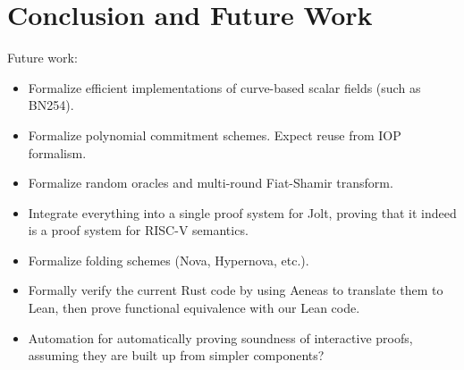 \section{Conclusion and Future Work}

Future work:
\begin{itemize}
    \item Formalize efficient implementations of curve-based scalar fields (such as BN254).
    \item Formalize polynomial commitment schemes. Expect reuse from IOP formalism.
    \item Formalize random oracles and multi-round Fiat-Shamir transform.
    \item Integrate everything into a single proof system for Jolt, proving that it indeed is a proof system for RISC-V semantics.
    \item Formalize folding schemes (Nova, Hypernova, etc.).
    \item Formally verify the current Rust code by using Aeneas to translate them to Lean, then prove functional equivalence with our Lean code.
    \item Automation for automatically proving soundness of interactive proofs, assuming they are built up from simpler components?
\end{itemize}